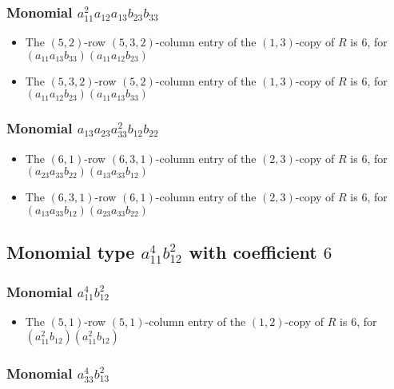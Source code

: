 \documentclass{article}
\begin{document}
\subsubsection{Monomial $ a_{11}^{2} a_{12} a_{13} b_{23} b_{33} $}

\begin{itemize}
\item The $(5, 2)$-row $(5, 3, 2)$-column entry of the $ \left(1, 3\right) $-copy of $R$ is $ 6 $, for $( a_{11} a_{13} b_{33} )( a_{11} a_{12} b_{23} )$ 
\item The $(5, 3, 2)$-row $(5, 2)$-column entry of the $ \left(1, 3\right) $-copy of $R$ is $ 6 $, for $( a_{11} a_{12} b_{23} )( a_{11} a_{13} b_{33} )$ 
\end{itemize}
\subsubsection{Monomial $ a_{13} a_{23} a_{33}^{2} b_{12} b_{22} $}

\begin{itemize}
\item The $(6, 1)$-row $(6, 3, 1)$-column entry of the $ \left(2, 3\right) $-copy of $R$ is $ 6 $, for $( a_{23} a_{33} b_{22} )( a_{13} a_{33} b_{12} )$ 
\item The $(6, 3, 1)$-row $(6, 1)$-column entry of the $ \left(2, 3\right) $-copy of $R$ is $ 6 $, for $( a_{13} a_{33} b_{12} )( a_{23} a_{33} b_{22} )$ 
\end{itemize}
\subsection{Monomial type $ a_{11}^{4} b_{12}^{2} $ with coefficient $ 6 $}

\subsubsection{Monomial $ a_{11}^{4} b_{12}^{2} $}

\begin{itemize}
\item The $(5, 1)$-row $(5, 1)$-column entry of the $ \left(1, 2\right) $-copy of $R$ is $ 6 $, for $( a_{11}^{2} b_{12} )( a_{11}^{2} b_{12} )$ 
\end{itemize}
\subsubsection{Monomial $ a_{33}^{4} b_{13}^{2} $}
\end{document}
